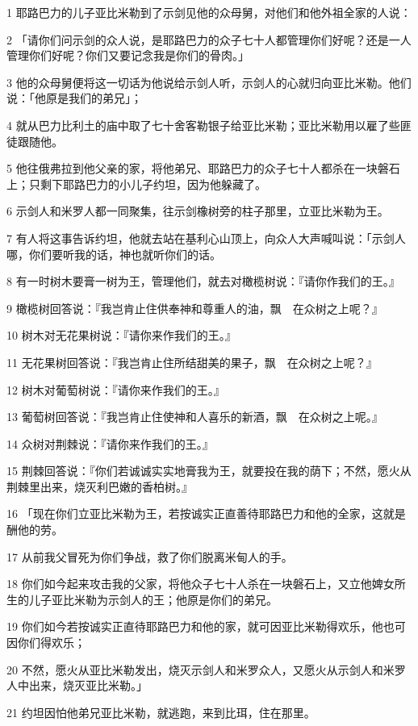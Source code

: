 \par 1 耶路巴力的儿子亚比米勒到了示剑见他的众母舅，对他们和他外祖全家的人说：
\par 2 「请你们问示剑的众人说，是耶路巴力的众子七十人都管理你们好呢？还是一人管理你们好呢？你们又要记念我是你们的骨肉。」
\par 3 他的众母舅便将这一切话为他说给示剑人听，示剑人的心就归向亚比米勒。他们说：「他原是我们的弟兄」；
\par 4 就从巴力比利土的庙中取了七十舍客勒银子给亚比米勒；亚比米勒用以雇了些匪徒跟随他。
\par 5 他往俄弗拉到他父亲的家，将他弟兄、耶路巴力的众子七十人都杀在一块磐石上；只剩下耶路巴力的小儿子约坦，因为他躲藏了。
\par 6 示剑人和米罗人都一同聚集，往示剑橡树旁的柱子那里，立亚比米勒为王。
\par 7 有人将这事告诉约坦，他就去站在基利心山顶上，向众人大声喊叫说：「示剑人哪，你们要听我的话，神也就听你们的话。
\par 8 有一时树木要膏一树为王，管理他们，就去对橄榄树说：『请你作我们的王。』
\par 9 橄榄树回答说：『我岂肯止住供奉神和尊重人的油，飘　在众树之上呢？』
\par 10 树木对无花果树说：『请你来作我们的王。』
\par 11 无花果树回答说：『我岂肯止住所结甜美的果子，飘　在众树之上呢？』
\par 12 树木对葡萄树说：『请你来作我们的王。』
\par 13 葡萄树回答说：『我岂肯止住使神和人喜乐的新酒，飘　在众树之上呢。』
\par 14 众树对荆棘说：『请你来作我们的王。』
\par 15 荆棘回答说：『你们若诚诚实实地膏我为王，就要投在我的荫下；不然，愿火从荆棘里出来，烧灭利巴嫩的香柏树。』
\par 16 「现在你们立亚比米勒为王，若按诚实正直善待耶路巴力和他的全家，这就是酬他的劳。
\par 17 从前我父冒死为你们争战，救了你们脱离米甸人的手。
\par 18 你们如今起来攻击我的父家，将他众子七十人杀在一块磐石上，又立他婢女所生的儿子亚比米勒为示剑人的王；他原是你们的弟兄。
\par 19 你们如今若按诚实正直待耶路巴力和他的家，就可因亚比米勒得欢乐，他也可因你们得欢乐；
\par 20 不然，愿火从亚比米勒发出，烧灭示剑人和米罗众人，又愿火从示剑人和米罗人中出来，烧灭亚比米勒。」
\par 21 约坦因怕他弟兄亚比米勒，就逃跑，来到比珥，住在那里。
